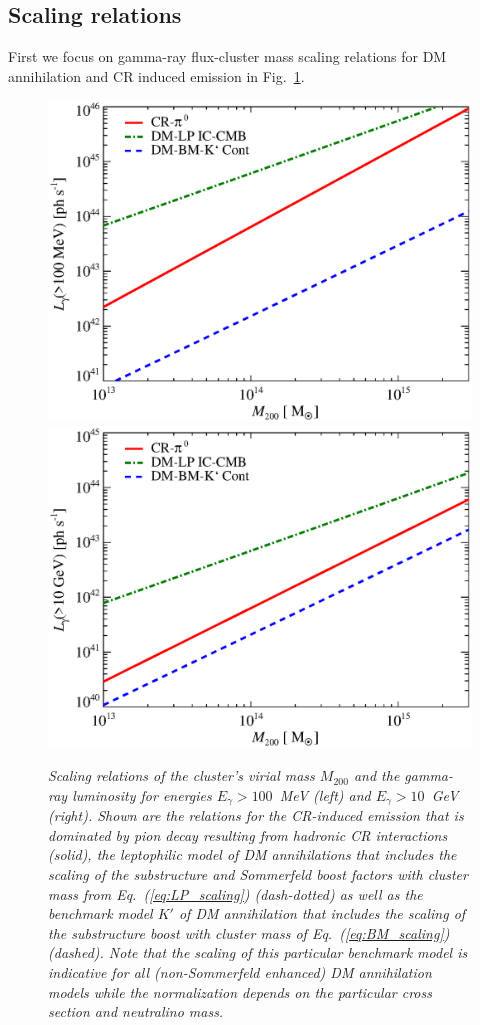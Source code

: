 \documentclass[10pt,aps,pra,reprint,amsmath,amsfonts,amssymb,showpacs,nofootinbib,floatfix]{revtex4-1}
\newcommand{\mvir}{M_{200}}
\begin{document}
\subsection{Scaling relations}
First we focus on gamma-ray flux-cluster mass scaling relations for DM
annihilation and CR induced emission in
Fig.~\ref{fig:lum_mass_scaling}.  
\begin{figure}
  \includegraphics[width=0.99\columnwidth]{figures/MLscaling.100M.eps}
  \includegraphics[width=0.99\columnwidth]{figures/MLscaling.10G.eps}
  \caption{\it Scaling relations of the cluster's virial mass $\mvir$ and the
    gamma-ray luminosity for energies $E_\gamma>100$~MeV (left) and
    $E_\gamma>10$~GeV (right).  Shown are the relations for the CR-induced
    emission that is dominated by pion decay resulting from hadronic CR
    interactions (solid), the leptophilic model of DM annihilations that
    includes the scaling of the substructure and Sommerfeld boost factors with
    cluster mass from Eq.~(\ref{eq:LP_scaling}) (dash-dotted) as well as the
    benchmark model $K'$ of DM annihilation that includes the scaling of the
    substructure boost with cluster mass of Eq.~(\ref{eq:BM_scaling})
    (dashed). Note that the scaling of this particular benchmark model is
    indicative for all (non-Sommerfeld enhanced) DM annihilation models while
    the normalization depends on the particular cross section and neutralino
    mass.}
\label{fig:lum_mass_scaling}
\end{figure}
\end{document}
